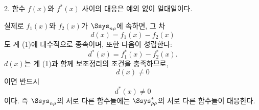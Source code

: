 
2. 함수 $f(x)$와 $f^*(x)$ 사이의 대응은 예외 없이 일대일이다.

실제로 $f_1(x)$와 $f_2(x)$가 $\Ssys_{n\rho}$에 속하면, 그 차
\[
d(x)=f_1(x)-f_2(x)
\]
도 계 (1)에 대수적으로 종속이며, 또한 다음이 성립한다:
\[
d^*(x)=f_1^*(x)-f_2^*(x).
\]
$d(x)$는 계 (1)과 함께 보조정리의 조건을 충족하므로,
\[
d(x)\ne0
\]
이면 반드시
\[
d^*(x)\ne0
\]
이다. 즉 $\Ssys_{n\rho}$의 서로 다른 함수들에는 $\Ssys^*_{\rho\rho}$의 서로 다른 함수들이 대응한다.
